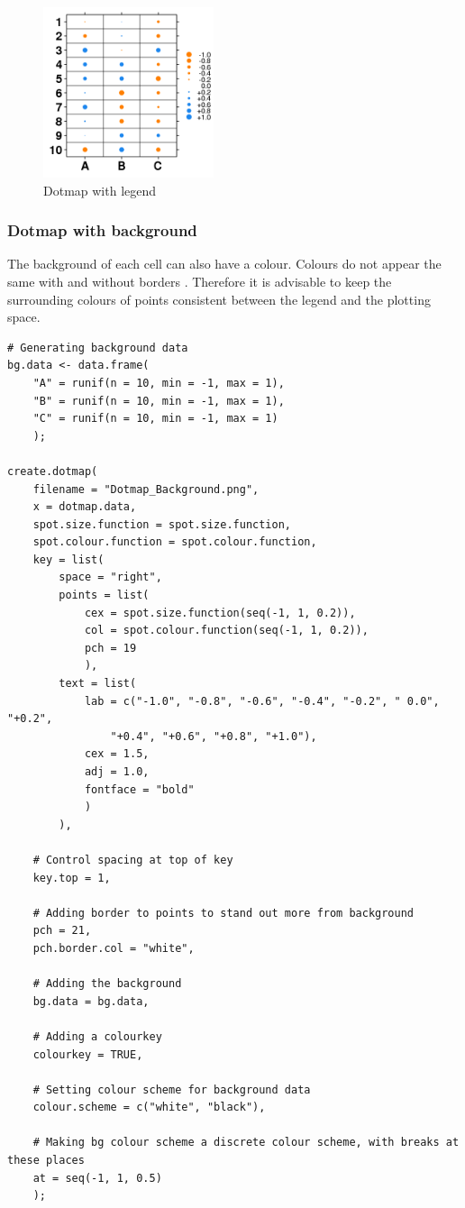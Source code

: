 \documentclass[letterpaper]{article}
\begin{document}
\begin{figure}[!ht]
  \begin{center}
     \includegraphics[width=50mm]{Figures/Dotmap_Legend.png}
     \caption{Dotmap with legend}
  \end{center}
\end{figure}

\subsubsection{Dotmap with background}
The background of each cell can also have a colour. Colours do not appear the same with and without borders \cite{brewer-colour}. Therefore it is advisable to keep the surrounding colours of points consistent between the legend and the plotting space.

\begin{verbatim}
# Generating background data
bg.data <- data.frame(
    "A" = runif(n = 10, min = -1, max = 1),
    "B" = runif(n = 10, min = -1, max = 1),
    "C" = runif(n = 10, min = -1, max = 1)
    );

create.dotmap(
    filename = "Dotmap_Background.png",
    x = dotmap.data,
    spot.size.function = spot.size.function,
    spot.colour.function = spot.colour.function,    
    key = list(
        space = "right",
        points = list(
            cex = spot.size.function(seq(-1, 1, 0.2)),
            col = spot.colour.function(seq(-1, 1, 0.2)),
            pch = 19
            ),
        text = list(
            lab = c("-1.0", "-0.8", "-0.6", "-0.4", "-0.2", " 0.0", "+0.2", 
                "+0.4", "+0.6", "+0.8", "+1.0"),
            cex = 1.5,
            adj = 1.0,
            fontface = "bold"
            )
        ),
    
    # Control spacing at top of key
    key.top = 1,

    # Adding border to points to stand out more from background
    pch = 21,
    pch.border.col = "white",
    
    # Adding the background
    bg.data = bg.data,

    # Adding a colourkey
    colourkey = TRUE,
    
    # Setting colour scheme for background data
    colour.scheme = c("white", "black"),
    
    # Making bg colour scheme a discrete colour scheme, with breaks at these places
    at = seq(-1, 1, 0.5)
    );
\end{verbatim}
\end{document}
